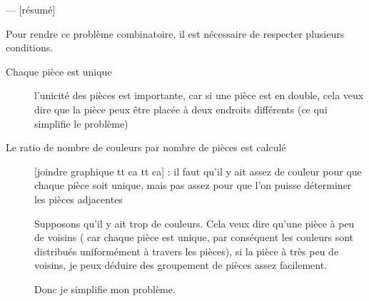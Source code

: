 	
	--- [résumé]
	
	Pour rendre ce problème combinatoire, il est nécessaire de respecter plusieurs conditions.
	
	\begin{description}
		\item[Chaque pièce est unique] l'unicité des pièces est importante, car si une pièce est en double, cela veux dire que la pièce peux être placée à deux endroits différents (ce qui simplifie le problème)
		\item[Le ratio de nombre de couleurs par nombre de pièces est calculé] [joindre graphique tt ca tt ca] : il faut qu'il y ait assez de couleur pour que chaque pièce soit unique, mais pas assez pour que l'on puisse déterminer les pièces adjacentes
		
		\begin{exmp}
			Supposons qu'il y ait trop de couleurs. Cela veux dire qu'une pièce à peu de voisins ( car chaque pièce est unique, par conséquent les couleurs sont distribués uniformément à travers les pièces), si la pièce à très peu de voisins, je peux déduire des groupement de pièces assez facilement.
			
			Donc je simplifie mon problème.
		\end{exmp}		
	\end{description}
